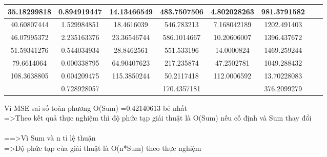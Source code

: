 \documentclass{article}
\begin{document}
\begin{flushleft}
\begin{adjustbox}{width=1.1\textwidth,center=\textwidth}
\begin{tabular}{|c|c|c|c|c|c|c|c|}
        35.18299818	&0.894919447&	14.13466549&	483.7507506&	4.802028263&	981.3791582\\\hline
        40.60807444	&1.529984851&	18.4616039&     546.783213& 	7.168042189&	1202.491403\\\hline
        46.07995372	&2.235163376&	23.36546744&	586.1014667&	10.20606007&	1396.437672\\\hline
        51.59341276	&0.544034934&	28.8462561&	    551.533196&	    14.0000824&	1469.259244\\\hline
        79.6614064	&0.000338795&	64.90407623&	217.235874&	    47.2502781&	1049.288432\\\hline
        108.3638805	&0.004209475&	115.3850244&	50.2117418&	    112.0006592&	13.70228083\\

        \hline
        {}&	0.728928057&{}&170.4357181&{}&376.2099279

\\
        \hline
        \end{tabular}
        \end{adjustbox}
    \end{flushleft}
    
    Vì MSE sai số toàn phương O(Sum)  =0.42140613 bé nhất\\
    =>Theo kết quả thực nghiệm thì độ phức tạp giải thuật là  O(Sum) nếu  cố định và Sum thay đổi\\\\
    
    ==>Vì Sum và n tỉ lệ thuận\\
    =>Độ phức tạp của giải thuật là O(n*Sum) theo thực nghiệm 
    
    \newpage
\end{document}
